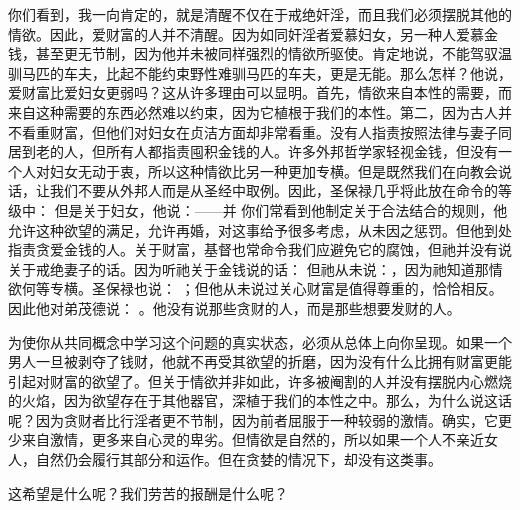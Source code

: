 \par

你们看到，我一向肯定的，就是清醒不仅在于戒绝奸淫，而且我们必须摆脱其他的情欲。因此，爱财富的人并不清醒。因为如同奸淫者爱慕妇女，另一种人爱慕金钱，甚至更无节制，因为他并未被同样强烈的情欲所驱使。肯定地说，不能驾驭温驯马匹的车夫，比起不能约束野性难驯马匹的车夫，更是无能。那么怎样？他说，爱财富比爱妇女更弱吗？这从许多理由可以显明。首先，情欲来自本性的需要，而来自这种需要的东西必然难以约束，因为它植根于我们的本性。第二，因为古人并不看重财富，但他们对妇女在贞洁方面却非常看重。没有人指责按照法律与妻子同居到老的人，但所有人都指责囤积金钱的人。许多外邦哲学家轻视金钱，但没有一个人对妇女无动于衷，所以这种情欲比另一种更加专横。但是既然我们在向教会说话，让我们不要从外邦人而是从圣经中取例。因此，圣保禄几乎将此放在命令的等级中：  但是关于妇女，他说：——并  你们常看到他制定关于合法结合的规则，他允许这种欲望的满足，允许再婚，对这事给予很多考虑，从未因之惩罚。但他到处指责贪爱金钱的人。关于财富，基督也常命令我们应避免它的腐蚀，但祂并没有说关于戒绝妻子的话。因为听祂关于金钱说的话：  但祂从未说：，因为祂知道那情欲何等专横。圣保禄也说： ；但他从未说过关心财富是值得尊重的，恰恰相反。因此他对弟茂德说： 。他没有说那些贪财的人，而是那些想要发财的人。\par

为使你从共同概念中学习这个问题的真实状态，必须从总体上向你呈现。如果一个男人一旦被剥夺了钱财，他就不再受其欲望的折磨，因为没有什么比拥有财富更能引起对财富的欲望了。但关于情欲并非如此，许多被阉割的人并没有摆脱内心燃烧的火焰，因为欲望存在于其他器官，深植于我们的本性之中。那么，为什么说这话呢？因为贪财者比行淫者更不节制，因为前者屈服于一种较弱的激情。确实，它更少来自激情，更多来自心灵的卑劣。但情欲是自然的，所以如果一个人不亲近女人，自然仍会履行其部分和运作。但在贪婪的情况下，却没有这类事。\par

\par

这希望是什么呢？我们劳苦的报酬是什么呢？\par

\par


